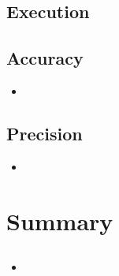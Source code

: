 \documentclass{scrartcl}
\begin{document}
\subsection{Execution}


\subsection{Accuracy}
\begin{itemize}
\item
\end{itemize}

\subsection{Precision}
\begin{itemize}
\item
\end{itemize}

\section{Summary}
\subsection{}
\begin{itemize}
\item
\end{itemize}








%




\end{document}
